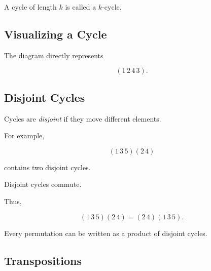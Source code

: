 A cycle of length \(k\) is called a \(k\)-cycle.

\subsection{Visualizing a Cycle}
\label{subsec:visual-cycle}

\begin{center}
\end{center}

The diagram directly represents

\[ (1\,2\,4\,3). \]

\subsection{Disjoint Cycles}
\label{subsec:disjoint-cycles}

Cycles are \emph{disjoint} if they move different elements.

For example,

\[ (1\,3\,5)(2\,4) \]

contains two disjoint cycles.

Disjoint cycles commute.

Thus,

\[ (1\,3\,5)(2\,4)=(2\,4)(1\,3\,5). \]

Every permutation can be written as a product of disjoint cycles.

\subsection{Transpositions}
\label{subsec:transpositions}

